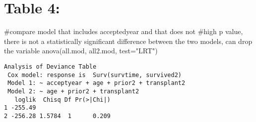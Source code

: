 \documentclass[
  letterpaper,
  DIV=11,
  numbers=noendperiod]{scrreprt}
\newenvironment{Shaded}{\begin{snugshade}}{\end{snugshade}}
\newcommand{\AttributeTok}[1]{\textcolor[rgb]{0.40,0.45,0.13}{#1}}
\newcommand{\CommentTok}[1]{\textcolor[rgb]{0.37,0.37,0.37}{#1}}
\newcommand{\FunctionTok}[1]{\textcolor[rgb]{0.28,0.35,0.67}{#1}}
\newcommand{\NormalTok}[1]{\textcolor[rgb]{0.00,0.23,0.31}{#1}}
\newcommand{\StringTok}[1]{\textcolor[rgb]{0.13,0.47,0.30}{#1}}
\begin{document}
\hypertarget{table-4}{%
\section{Table 4:}\label{table-4}}

\begin{Shaded}
\begin{Highlighting}[]
\CommentTok{\#compare model that includes acceptedyear and that does not}
\CommentTok{\#high p value, there is not a statistically significant difference between the two models, can drop the variable}
\FunctionTok{anova}\NormalTok{(all.mod, all2.mod, }\AttributeTok{test=}\StringTok{"LRT"}\NormalTok{)}
\end{Highlighting}
\end{Shaded}

\begin{verbatim}
Analysis of Deviance Table
 Cox model: response is  Surv(survtime, survived2)
 Model 1: ~ acceptyear + age + prior2 + transplant2
 Model 2: ~ age + prior2 + transplant2
   loglik  Chisq Df Pr(>|Chi|)
1 -255.49                     
2 -256.28 1.5784  1      0.209
\end{verbatim}
\end{document}
